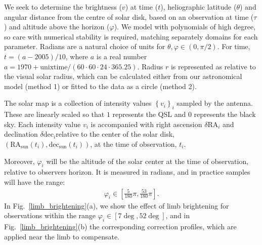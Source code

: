 \documentclass{aa}
\newcommand{\eqnl}[2]{\begin{eqnarray}\label{#1}#2\end{eqnarray}}
\begin{document}
We seek to determine the brightness ($v$) at time ($t$), heliographic latitude
($\theta$) and angular distance from the centre of solar disk, based on an
observation at time ($\tau$) and altitude above the horizon ($\varphi$).
We model with polynomials of high degree, so care with numerical stability is 
required, matching separately domains for each parameter.
Radians are a natural choice of units for $\theta, \varphi \in \left( 0, \pi/2 
\right)$. For time, $t = (a - 2005)/10$, where $a$ is a real number $a = 1970 +
\mathrm{unixtime}/(60\cdot60\cdot24\cdot365.25)$. Radius $r$ is represented as
relative to the visual solar radius, which can be calculated either from our
astronomical model (method 1) or fitted to the data as a circle (method 2).

The solar map is a collection of intensity values $\left\{ v_i \right\}_i$ 
sampled by the antenna.
These are linearly scaled so that $1$ represents the QSL and $0$ represents
the black sky.
Each intensity value $v_i$ is accompanied with right ascension $\delta \mathrm{RA}_i$ and declination $\delta 
\mathrm{dec}_i$relative to the center of the solar disk, $\left( \mathrm{RA}_{\mathrm{sun}}(t_i), 
\mathrm{dec}_{\mathrm{sun}}(t_i) \right)$, at the time of observation, $t_i$.


Moreover, $\varphi_i$ will be the altitude of the solar center at the time of observation, relative 
to observers horizon. It is measured in radians, and in practice samples will have the range:
\eqnl{altitude_range}{
\varphi_i \in \left[ \frac{5}{180} \pi, \frac{53}{180} \pi \right] \text{.}
}
In Fig.~\ref{limb_brightening}(a), we show the effect of limb brightening for
observations within the range $\varphi_i\in[7\deg,52\deg]$, and in
Fig.~\ref{limb_brightening}(b) the corresponding correction profiles, which 
are applied near the limb to compensate.
\end{document}
